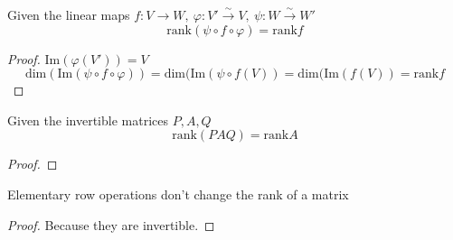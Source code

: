 \begin{theorem}[\(\text{rank}(\psi \circ f \circ \varphi) = \text{rank}f\)]
   Given the linear maps \(f: V \to W,~\varphi: V' \xrightarrow{\sim} V,~\psi: W \xrightarrow{\sim} W'\)
   \[\text{rank}(\psi \circ f \circ \varphi) = \text{rank}f\]
\end{theorem}
\begin{proof}
   \(\text{Im}(\varphi(V')) = V\)
   \[\text{dim}(\text{Im}(\psi \circ f \circ \varphi)) = \text{dim}(\text{Im}(\psi \circ f(V)) = \text{dim}(\text{Im}(f(V)) = \text{rank}f\]
\end{proof}

\begin{corollary}%
   Given the invertible matrices \(P, A, Q\)
   \[\text{rank}(P A Q) = \text{rank}A\]
\end{corollary}
\begin{proof}
\end{proof}

\begin{corollary}
   Elementary row operations don't change the rank of a matrix
\end{corollary}
\begin{proof}
   Because they are invertible.
\end{proof}
